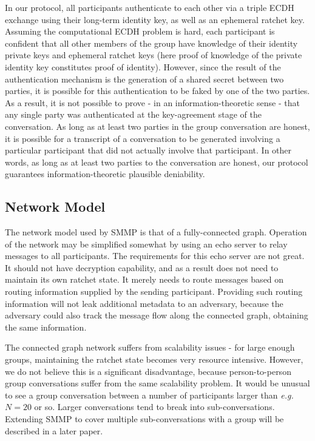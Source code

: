 \documentclass[%
preprint,
amsmath,amssymb,
aps,
prb,
floatfix,
]{revtex4-1}
\begin{document}
In our protocol, all participants authenticate to each other via a triple ECDH
exchange using their long-term identity key, as well as an ephemeral ratchet
key. Assuming the computational ECDH problem is hard, each participant is
confident that all other members of the group have knowledge of their identity
private keys and ephemeral ratchet keys (here proof of knowledge of the private
identity key constitutes proof of identity). However, since the result of the
authentication mechanism is the generation of a shared secret between two
parties, it is possible for this authentication to be faked by one of the two
parties. As a result, it is not possible to prove - in an information-theoretic
sense - that any single party was authenticated at the key-agreement stage of
the conversation.  As long as at least two parties in the group conversation are
honest, it is possible for a transcript of a conversation to be generated
involving a particular participant that did not actually involve that
participant. In other words, as long as at least two parties to the conversation
are honest, our protocol guarantees information-theoretic plausible deniability.

\subsection{\label{sec:networkmodel}Network Model}
The network model used by SMMP is that of a fully-connected graph.
Operation of the network may be simplified somewhat by using an echo server to
relay messages to all participants. The requirements for this echo server are
not great. It should not have decryption capability, and as a result does not
need to maintain its own ratchet state. It merely needs to route messages based
on routing information supplied by the sending participant. Providing such routing
information will not leak additional metadata to an adversary, because the
adversary could also track the message flow along the connected graph, obtaining
the same information.

The connected graph network suffers from scalability issues - for large enough
groups, maintaining the ratchet state becomes very resource intensive. However,
we do not believe this is a significant disadvantage, because person-to-person
group conversations suffer from the same scalability problem. It  would be
unusual to see a group conversation between a number of participants larger
than \textit{e.g.} $N = 20$ or so. Larger conversations tend to break into
sub-conversations.
Extending SMMP to cover multiple sub-conversations with a group will be
described in a later paper.
\end{document}
